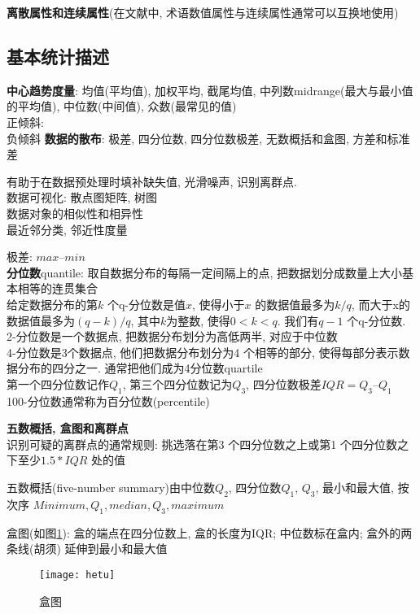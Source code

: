 \documentclass{article}
\begin{document}
\textbf{离散属性和连续属性}(在文献中, 术语数值属性与连续属性通常可以互换地使用)

\subsection{基本统计描述}
\textbf{中心趋势度量}: 均值(平均值), 加权平均, 截尾均值, 中列数midrange(最大与最小值的平均值), 中位数(中间值), 众数(最常见的值)\\
	正倾斜:\\
	负倾斜
\textbf{数据的散布}: 极差, 四分位数, 四分位数极差, 无数概括和盒图, 方差和标准差

有助于在数据预处理时填补缺失值, 光滑噪声, 识别离群点.\\
数据可视化: 散点图矩阵, 树图\\
数据对象的相似性和相异性\\
最近邻分类, 邻近性度量

极差: $max – min$ \\
\textbf{分位数}quantile: 取自数据分布的每隔一定间隔上的点, 把数据划分成数量上大小基本相等的连贯集合\\
给定数据分布的第$k$ 个q-分位数是值$x$, 使得小于$x$ 的数据值最多为$k/q$, 而大于x的数据值最多为$(q-k)/q$, 其中$k$为整数, 使得$0<k<q$. 我们有$q-1$ 个q-分位数.
2-分位数是一个数据点, 把数据分布划分为高低两半, 对应于中位数\\
4-分位数是3个数据点, 他们把数据分布划分为4 个相等的部分, 使得每部分表示数据分布的四分之一. 通常把他们成为4分位数quartile\\
第一个四分位数记作$Q_1$, 第三个四分位数记为$Q_3$, 四分位数极差$IQR = Q_3 – Q_1$\\
100-分位数通常称为百分位数(percentile)

\textbf{五数概括, 盒图和离群点}\\
识别可疑的离群点的通常规则: 挑选落在第3 个四分位数之上或第1 个四分位数之下至少$1.5 * IQR$ 处的值\par
五数概括(five-number summary)由中位数$Q_2$, 四分位数$Q_1$, $Q_3$, 最小和最大值, 按次序
$Minimum, Q_1, median, Q_3, maximum$\par
盒图(如图\ref{fig.hetu}): 盒的端点在四分位数上, 盒的长度为IQR; 中位数标在盒内; 盒外的两条线(胡须) 延伸到最小和最大值\\
\begin{figure}[htbp]
  \centering
  \texttt{[image: hetu]}\\
  \caption{盒图}
  \label{fig.hetu}
\end{figure}
\end{document}
